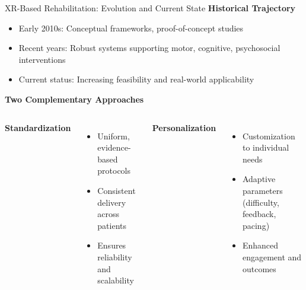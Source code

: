

\begin{frame}{XR-Based Rehabilitation: Evolution and Current State}
	\textbf{\textcolor{gbAqua}{Historical Trajectory}}
	
	\begin{itemize}
		\item Early 2010s: Conceptual frameworks, proof-of-concept studies
		\item Recent years: Robust systems supporting motor, cognitive, psychosocial interventions
		\item Current status: Increasing feasibility and real-world applicability
	\end{itemize}
	
	\vspace{0.3cm}
	
	\textbf{\textcolor{gbAqua}{Two Complementary Approaches}}
	
	\begin{columns}[t]
		\textbf{Standardization}
		
		\begin{itemize}
			\item Uniform, evidence-based protocols
			\item Consistent delivery across patients
			\item Ensures reliability and scalability
		\end{itemize}
		
		\textbf{Personalization}
		
		\begin{itemize}
			\item Customization to individual needs
			\item Adaptive parameters (difficulty, feedback, pacing)
			\item Enhanced engagement and outcomes
		\end{itemize}
	\end{columns}
	
\end{frame}

